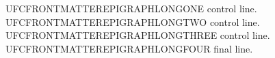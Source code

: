 UFCFRONTMATTEREPIGRAPHLONGONE control line.\\
UFCFRONTMATTEREPIGRAPHLONGTWO control line.\\
UFCFRONTMATTEREPIGRAPHLONGTHREE control line.\\
UFCFRONTMATTEREPIGRAPHLONGFOUR final line.
